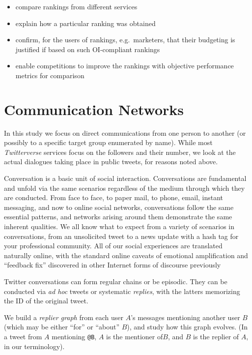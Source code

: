 \documentclass[10pt,oneside]{memoir}
\begin{document}
\begin{itemize}


\item compare rankings from different services

\item explain how a particular ranking was obtained

\item confirm, for the users of rankings, e.g.\ marketers, that their budgeting is justified if based on such OI-compliant rankings

\item enable competitions to improve the rankings with objective performance metrics for comparison
\end{itemize}

\pagebreak \section{Communication Networks}
\label{communicationnetworks}

In this study we focus on direct communications from one person to another (or possibly to a specific target group enumerated by name).  While most {\itshape Twitterverse} services focus on the followers and their number, we look at the actual dialogues taking place in public tweets, for reasons noted above.


Conversation is a basic unit of social interaction.  Conversations are fundamental and unfold via the same scenarios regardless of the medium through which they are conducted.  From face to face, to paper mail, to phone, email, instant messaging, and now to online social networks, conversations follow the same essential patterns, and networks arising around them demonstrate the same inherent qualities.  We all know what to expect from a variety of scenarios in conversations, from an unsolicited tweet to a news update with a hash tag for your professional community.  All of our social experiences are translated naturally online, with the standard online caveats of emotional amplification and ``feedback fix'' discovered in other Internet forms of discourse previously


Twitter conversations can form regular chains or be episodic.  They can be conducted via {\itshape ad hoc} tweets or systematic {\itshape replies}, with the latters memorizing the ID of the original tweet.


We build a {\itshape replier graph} from each user $A$'s messages mentioning another user $B$ (which may be either ``for'' or ``about'' $B$), and study how this graph evolves.  (In a tweet from $A$ mentioning \verb|@B|,  $A$ is the mentioner of$B$, and $B$ is the replier of $A$, in our terminology). 
\end{document}
